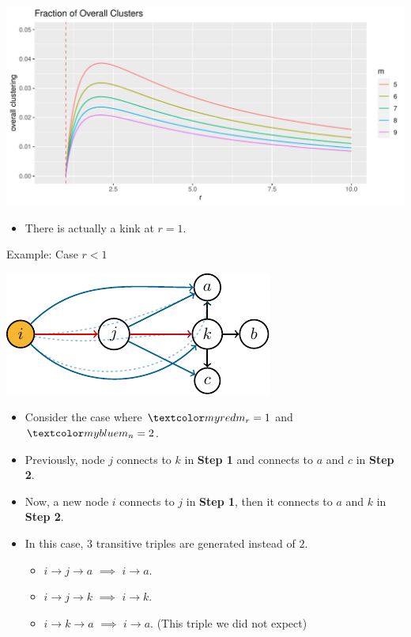 \documentclass{beamer}
\begin{document}
\begin{frame}{}\label{fig:clustering-estimation}
	\begin{center}
		\includegraphics[width=\textwidth]{figures-R/clustering-estimation.pdf}
	\end{center}
	\begin{itemize}
		\item
			There is actually a kink at $r=1$.
	\end{itemize}
\end{frame}

\begin{frame}{Example: Case $r<1$}
	\begin{center}
		\includegraphics[scale=1]{figures-tikz/r_leq_1.pdf}
	\end{center}
	\begin{itemize}
		\item
			Consider the case where $\red{m_{r}=1}$ and $\blue{m_{n}=2}$.
		\item
			Previously, node $j$ connects to $k$ in \textbf{Step 1}
			and connects to $a$ and $c$ in \textbf{Step 2}.
		\item
			Now, a new node $i$ connects to $j$ in \textbf{Step 1},
			then it connects to $a$ and $k$ in \textbf{Step 2}.
		\item
			In this case, $3$ transitive triples are generated instead of $2$.
			\begin{itemize}
				\item $i\to j\to a$ $\implies$ $i\to a$.
				\item $i\to j\to k$ $\implies$ $i\to k$.
				\item $i\to k\to a$ $\implies$ $i\to a$. (This triple we did not expect)
			\end{itemize}
	\end{itemize}
\end{frame}
\end{document}
